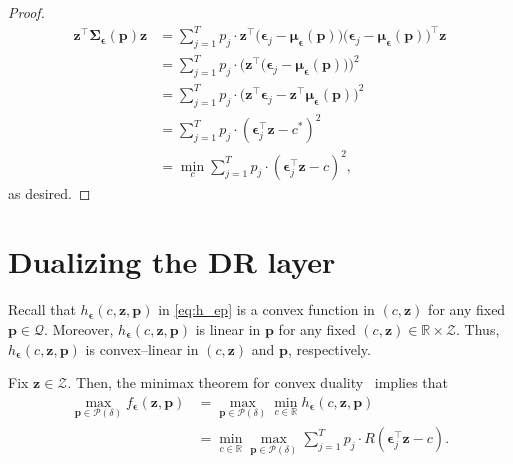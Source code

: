\documentclass[10pt, twocolumn]{article}
\theoremstyle{plain}
\theoremstyle{definition}
\begin{document}
\begin{appendices}
\begin{proof}
	\begin{align*}
          \bm{z}^\top \bm{\Sigma}_{\bm{\epsilon}}(\bm{p})
          \bm{z} &= \sum_{j=1}^T p_j\cdot
                   \bm{z}^\top\big(\bm{\epsilon}_j -
                   \bm{\mu}_{\bm{\epsilon}}(\bm{p})\big)\big(\bm{\epsilon}_j
                   - \bm{\mu}_{\bm{\epsilon}}(\bm{p})\big)^\top
                   \bm{z}\\ 
                 &= \sum_{j=1}^T p_j\cdot
                   \Big(\bm{z}^\top\big(\bm{\epsilon}_j -
                   \bm{\mu}_{\bm{\epsilon}}(\bm{p})\big)\Big)^2\\ 
                 &= \sum_{j=1}^T p_j\cdot \big(\bm{z}^\top
                   \bm{\epsilon}_j - \bm{z}^\top
                   \bm{\mu}_{\bm{\epsilon}}(\bm{p})\big)^2\\ 
                 &= \sum_{j=1}^T p_j\cdot (\bm{\epsilon}_j^\top \bm{z} - c^*)^2\\
			&= \min_{c} \sum_{j=1}^T p_j\cdot (\bm{\epsilon}_j^\top \bm{z} - c)^2,
	\end{align*}
	as desired. 
\end{proof} 

\section{Dualizing the DR layer}\label{app:dual}

Recall that \(h_{\bm{\epsilon}}(c,\bm{z},\bm{p})\) in \eqref{eq:h_ep} is
a convex function in \((c, \bm{z})\) for any fixed 
\(\bm{p}\in\mathcal{Q}\). Moreover, \(h_{\bm{\epsilon}}(c,\bm{z},\bm{p})\) 
is linear in \(\bm{p}\) for any fixed 
\((c,\bm{z})\in\mathbb{R}\times\mathcal{Z}\). Thus,
\(h_{\bm{\epsilon}}(c,\bm{z},\bm{p})\) is convex--linear in \((c,\bm{z})\)
and \(\bm{p}\), respectively.  

Fix \(\bm{z} \in \mathcal{Z}\). Then, the  minimax theorem for convex duality~\citep{neumann1928theorie} implies that 
\begin{align*}
	\max_{\bm{p}\in\mathcal{P}(\delta)} f_{\bm{\epsilon}}(\bm{z},\bm{p})
	&= \max_{\bm{p}\in\mathcal{P}(\delta)} \min_{c\in\mathbb{R}} h_{\bm{\epsilon}}(c,\bm{z},\bm{p})\\
	&=\min_{c\in\mathbb{R}} \max_{\bm{p}\in\mathcal{P}(\delta)} \sum_{j=1}^T p_j \cdot R(\bm{\epsilon}_j^\top \bm{z} - c).
\end{align*}


\end{appendices}
\end{document}
